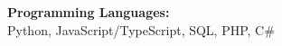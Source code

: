 \begin{CVsidebar}
\textbf{Programming Languages:} \\
\vspace{0.1em}
{\small Python, JavaScript/TypeScript, SQL, PHP, C\#} \\
\dotline


\end{CVsidebar}
